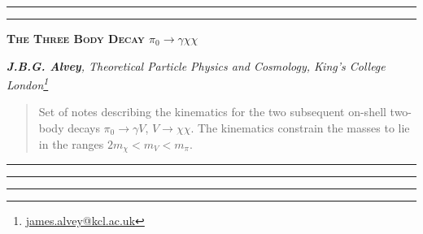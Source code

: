 \documentclass[10pt]{article}
\renewcommand*{\thefootnote}{\fnsymbol{footnote}}
\begin{document}
\hrule
\vspace{1pt}
\hrule
\begin{center}
\large\textsc{\color{darkblue}\textbf{The Three Body Decay $\pi_0 \rightarrow \gamma\chi\chi$}}
\vspace{5pt}

\footnotesize\textit{\textbf{J.B.G. Alvey}, Theoretical Particle Physics and Cosmology, King's College London\footnote{\href{mailto:james.alvey@kcl.ac.uk}{james.alvey@kcl.ac.uk}}}
\end{center}
\begin{abstract}
\noindent Set of notes describing the kinematics for the two subsequent on-shell two-body decays $\pi_0 \rightarrow \gamma V$, $V \rightarrow \chi\chi$. The kinematics constrain the masses to lie in the ranges $2 m_\chi < m_V < m_\pi$.
\end{abstract}
\hrule
\tableofcontents
\vspace{5pt}
\hrule
\vspace{1pt}
\hrule
\vspace{10pt}
\renewcommand{\thefootnote}{\tiny\textbf{\arabic{section}.\arabic{footnote}}}
\end{document}
